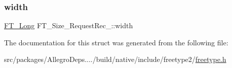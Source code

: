 \subsubsection{\texorpdfstring{width}{width}}
{\footnotesize\ttfamily \hyperlink{fttypes_8h_a7fa72a1f0e79fb1860c5965789024d6f}{F\+T\+\_\+\+Long} F\+T\+\_\+\+Size\+\_\+\+Request\+Rec\+\_\+\+::width}



The documentation for this struct was generated from the following file\+:\begin{DoxyCompactItemize}
\item 
src/packages/\+Allegro\+Deps..../build/native/include/freetype2/\hyperlink{freetype_8h}{freetype.\+h}\end{DoxyCompactItemize}

